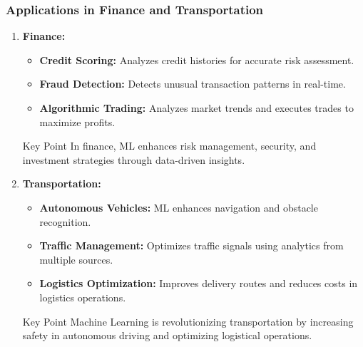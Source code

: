 \documentclass[aspectratio=169]{beamer}
\begin{document}
\begin{frame}[fragile]
    \frametitle{Applications in Finance and Transportation}
    \begin{enumerate}
        \item \textbf{Finance:}
            \begin{itemize}
                \item \textbf{Credit Scoring:} Analyzes credit histories for accurate risk assessment.
                \item \textbf{Fraud Detection:} Detects unusual transaction patterns in real-time.
                \item \textbf{Algorithmic Trading:} Analyzes market trends and executes trades to maximize profits.
            \end{itemize}
            \begin{block}{Key Point}
                In finance, ML enhances risk management, security, and investment strategies through data-driven insights.
            \end{block}
        \item \textbf{Transportation:}
            \begin{itemize}
                \item \textbf{Autonomous Vehicles:} ML enhances navigation and obstacle recognition.
                \item \textbf{Traffic Management:} Optimizes traffic signals using analytics from multiple sources.
                \item \textbf{Logistics Optimization:} Improves delivery routes and reduces costs in logistics operations.
            \end{itemize}
            \begin{block}{Key Point}
                Machine Learning is revolutionizing transportation by increasing safety in autonomous driving and optimizing logistical operations.
            \end{block}
    \end{enumerate}
\end{frame}
\end{document}
